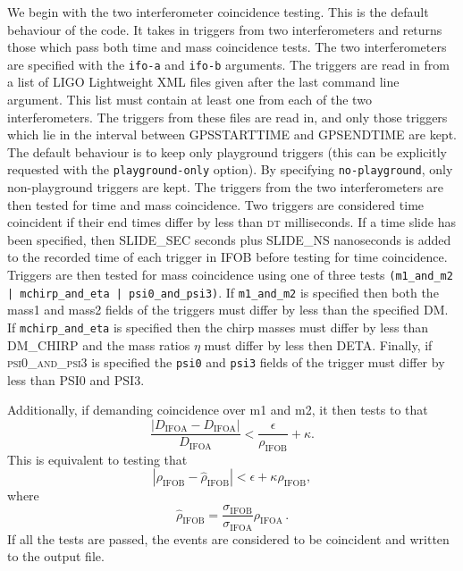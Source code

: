 \begin{entry}
We begin with the two interferometer coincidence testing.  This is the
default behaviour of the code.  It takes in triggers from two
interferometers and returns those which pass both time and mass
coincidence tests.  The two interferometers are specified with the
\texttt{ifo-a} and \texttt{ifo-b} arguments. The triggers are read in
from a list of LIGO Lightweight XML files given after the last command
line argument.  This list must contain at least one from each of the two
interferometers.  The triggers from these files are read in, and only
those triggers which lie in the interval between \textsc{GPSSTARTTIME} and
\textsc{GPSENDTIME} are kept. The default behaviour is to keep only
playground triggers (this can be explicitly requested with the
\texttt{playground-only} option).  By specifying
\texttt{no-playground}, only non-playground triggers are kept.  The
triggers from the two interferometers are then tested for time and mass
coincidence.  Two triggers are considered time coincident if their end
times differ by less than \textsc{dt} milliseconds.  If a time slide has
been specified, then \textsc{SLIDE\_SEC} seconds plus \textsc{SLIDE\_NS}
nanoseconds is added to the recorded time of each trigger in
\textsc{IFOB} before testing for time coincidence.  Triggers are then
tested for mass coincidence using one of three tests
\texttt{(m1\_and\_m2 | mchirp\_and\_eta | psi0\_and\_psi3)}.  If
\texttt{m1\_and\_m2} is specified then both the mass1 and mass2 fields
of the triggers must differ by less than the specified \textsc{DM}.  If
\texttt{mchirp\_and\_eta} is specified then the chirp masses must differ
by less than \textsc{DM\_CHIRP} and the mass ratios $\eta$ must differ
by less then \textsc{DETA}.  Finally, if \textsc{psi0\_and\_psi3} is
specified the \texttt{psi0} and \texttt{psi3} fields of the trigger must
differ by less than \textsc{PSI0} and \textsc{PSI3}.  

Additionally, if demanding coincidence over m1 and m2, it then tests to
that 
%
\begin{equation} \frac{\left|D_\mathrm{IFOA} -
  D_\mathrm{IFOA}\right|}{D_\mathrm{IFOA}} <
  \frac{\epsilon}{\rho_\mathrm{IFOB}} + \kappa.  \end{equation}
% 
This is equivalent to testing that 
%
\begin{equation}\label{snrtest} \left|\rho_\mathrm{IFOB} -
\hat{\rho}_\mathrm{IFOB}\right| < \epsilon + \kappa\rho_\mathrm{IFOB},
  \end{equation} 
%
where 
%
\begin{equation} \hat{\rho}_\mathrm{IFOB} = \frac{\sigma_\mathrm{IFOB}}
{\sigma_\mathrm{IFOA}} \rho_\mathrm{IFOA} \, .  \end{equation} 
%
If all the tests are passed, the events are considered to be coincident
and written to the output file.


\end{entry}
